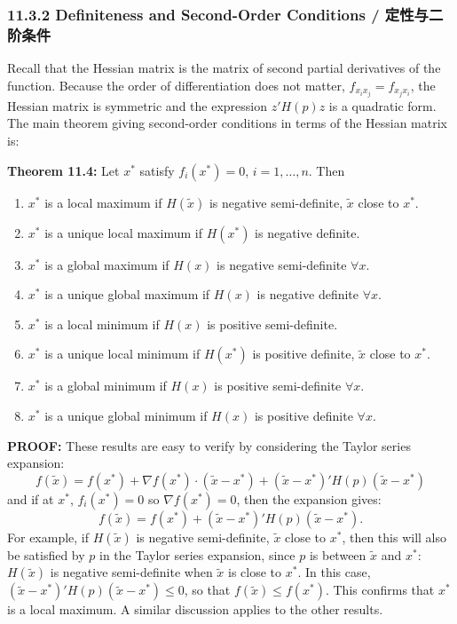 \subsubsection{11.3.2 Definiteness and Second-Order Conditions / 定性与二阶条件}

\begin{original}
Recall that the Hessian matrix is the matrix of second partial derivatives of the function. Because the order of differentiation does not matter, $f_{x_i x_j} = f_{x_j x_i}$, the Hessian matrix is symmetric and the expression $z'H(p)z$ is a quadratic form. The main theorem giving second-order conditions in terms of the Hessian matrix is:

\textbf{Theorem 11.4:} Let $x^*$ satisfy $f_i(x^*) = 0$, $i = 1,\ldots,n$. Then
\begin{enumerate}
\item $x^*$ is a local maximum if $H(\tilde{x})$ is negative semi-definite, $\tilde{x}$ close to $x^*$.
\item $x^*$ is a unique local maximum if $H(x^*)$ is negative definite.
\item $x^*$ is a global maximum if $H(x)$ is negative semi-definite $\forall x$.
\item $x^*$ is a unique global maximum if $H(x)$ is negative definite $\forall x$.
\item $x^*$ is a local minimum if $H(x)$ is positive semi-definite.
\item $x^*$ is a unique local minimum if $H(x^*)$ is positive definite, $\tilde{x}$ close to $x^*$.
\item $x^*$ is a global minimum if $H(x)$ is positive semi-definite $\forall x$.
\item $x^*$ is a unique global minimum if $H(x)$ is positive definite $\forall x$.
\end{enumerate}

\textbf{PROOF:} These results are easy to verify by considering the Taylor series expansion:
\[
f(\tilde{x}) = f(x^*) + \nabla f(x^*) \cdot (\tilde{x} - x^*) + (\tilde{x} - x^*)'H(p)(\tilde{x} - x^*)
\]
and if at $x^*$, $f_i(x^*) = 0$ so $\nabla f(x^*) = 0$, then the expansion gives:
\[
f(\tilde{x}) = f(x^*) + (\tilde{x} - x^*)'H(p)(\tilde{x} - x^*).
\]
For example, if $H(\tilde{x})$ is negative semi-definite, $\tilde{x}$ close to $x^*$, then this will also be satisfied by $p$ in the Taylor series expansion, since $p$ is between $\tilde{x}$ and $x^*$: $H(\tilde{x})$ is negative semi-definite when $\tilde{x}$ is close to $x^*$. In this case, $(\tilde{x} - x^*)'H(p)(\tilde{x} - x^*) \leq 0$, so that $f(\tilde{x}) \leq f(x^*)$. This confirms that $x^*$ is a local maximum. A similar discussion applies to the other results.
\end{original}
